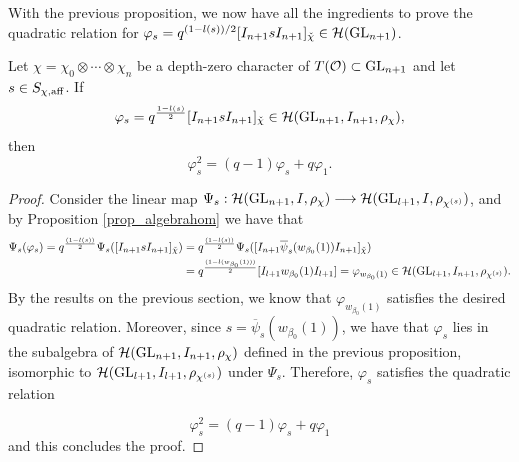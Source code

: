     With the previous proposition, we now have all the ingredients to prove the quadratic relation for $\varphi_s=q^{(1-l(s))/2}[I_{n+1}sI_{n+1}]_{\check{\chi}}\in\mathcal{H}(\mathrm{GL}_{n+1})$. 

    \begin{theorem}
        Let $\chi=\chi_0\otimes\cdots\otimes\chi_n$ be a depth-zero character of $T(\mathcal{O})\subset\mathrm{GL}_{n+1}$ and let $s\in S_{\chi,\mathrm{aff}}$. If $$\varphi_s=q^{\frac{1-l(s)}{2}}[I_{n+1}sI_{n+1}]_{\check{\chi}}\in\mathcal{H}(\mathrm{GL}_{n+1},I_{n+1},\rho_\chi),$$
        then
        $$\varphi_s^2=(q-1)\varphi_s+q\varphi_1.$$
    \end{theorem}
    \begin{proof}
        Consider the linear map $\Psi_s:\mathcal{H}(\mathrm{GL}_{n+1},I,\rho_\chi)\longrightarrow\mathcal{H}(\mathrm{GL}_{l+1},I,\rho_{\chi^{(s)}})$, and by Proposition \ref{prop_algebrahom} we have that 
        \begin{align*}
            \Psi_s(\varphi_s)=q^{\frac{(1-l(s))}{2}}\Psi_s([I_{n+1}sI_{n+1}]_{\check{\chi}})&=q^{\frac{(1-l(s))}{2}}\Psi_s([I_{n+1}\overline{\psi}_s(w_{\beta_0}(1))I_{n+1}]_{\check{\chi}})\\
            &=q^{\frac{(1-l(w_{\beta_0}(1)))}{2}}[I_{l+1}w_{\beta_0}(1)I_{l+1}]=\varphi_{w_{\beta_0}(1)}\in\mathcal{H}(\mathrm{GL}_{l+1},I_{n+1},\rho_{\chi^{(s)}}).
        \end{align*}
        By the results on the previous section, we know that $\varphi_{w_{\beta_0}(1)}$ satisfies the desired quadratic relation. Moreover, since $s=\overline{\psi}_s(w_{\beta_0}(1))$, we have that $\varphi_s$ lies in the subalgebra of $\mathcal{H}(\mathrm{GL}_{n+1},I_{n+1},\rho_\chi)$ defined in the previous proposition, isomorphic to $\mathcal{H}(\mathrm{GL}_{l+1},I_{l+1},\rho_{\chi^{(s)}})$ under $\Psi_s$. Therefore, $\varphi_s$ satisfies the quadratic relation

        $$\varphi_s^2=(q-1)\varphi_s+q\varphi_1$$
        and this concludes the proof.
    \end{proof}
